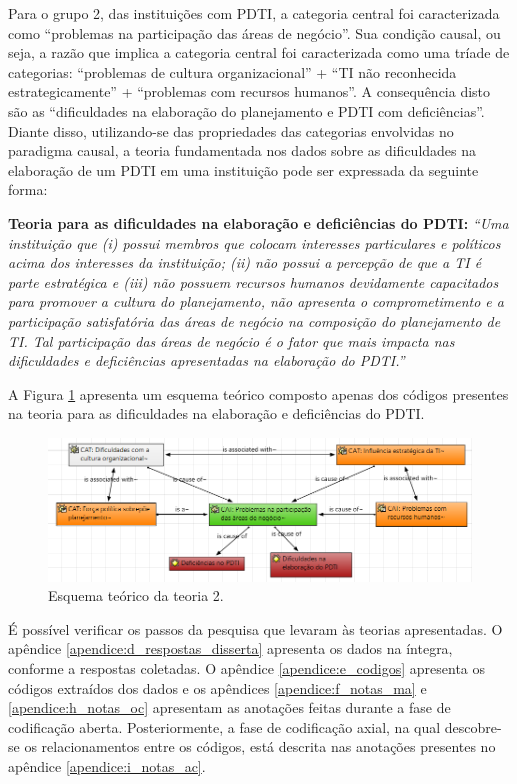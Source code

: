 Para o grupo 2, das instituições com PDTI, a categoria central foi caracterizada como ``problemas na participação das áreas de negócio''. Sua condição causal, ou seja, a razão que implica a categoria central foi caracterizada como uma tríade de categorias: ``problemas de cultura organizacional'' + ``TI não reconhecida estrategicamente'' + ``problemas com recursos humanos''. A consequência disto são as ``dificuldades na elaboração do planejamento e PDTI com deficiências''. Diante disso, utilizando-se das propriedades das categorias envolvidas no paradigma causal, a teoria fundamentada nos dados sobre as dificuldades na elaboração de um PDTI em uma instituição pode ser expressada da seguinte forma:

\textbf{Teoria para as dificuldades na elaboração e deficiências do PDTI:} \textit{``Uma instituição que (i) possui membros que colocam interesses particulares e políticos acima dos interesses da instituição; (ii) não possui a percepção de que a TI é parte estratégica e (iii) não possuem recursos humanos devidamente capacitados para promover a cultura do planejamento, não apresenta o comprometimento e a participação satisfatória das áreas de negócio na composição do planejamento de TI. Tal participação das áreas de negócio é o fator que mais impacta nas dificuldades e deficiências apresentadas na elaboração do PDTI.''}

A Figura \ref{figura:paradigma2} apresenta um esquema teórico composto apenas dos códigos presentes na teoria para as dificuldades na elaboração e deficiências do PDTI.

\begin{figure}[h!]
\centering %
\includegraphics[width=13cm, frame]{figuras/paradigma2.PNG}
\caption{Esquema teórico da teoria 2.}
\label{figura:paradigma2}
\end{figure}

É possível verificar os passos da pesquisa que levaram às teorias apresentadas. O apêndice \ref{apendice:d_respostas_disserta} apresenta os dados na íntegra, conforme a respostas coletadas. O apêndice \ref{apendice:e_codigos} apresenta os códigos extraídos dos dados e os apêndices \ref{apendice:f_notas_ma} e \ref{apendice:h_notas_oc} apresentam as anotações feitas durante a fase de codificação aberta. Posteriormente, a fase de codificação axial, na qual descobre-se os relacionamentos entre os códigos, está descrita nas anotações presentes no apêndice \ref{apendice:i_notas_ac}.

